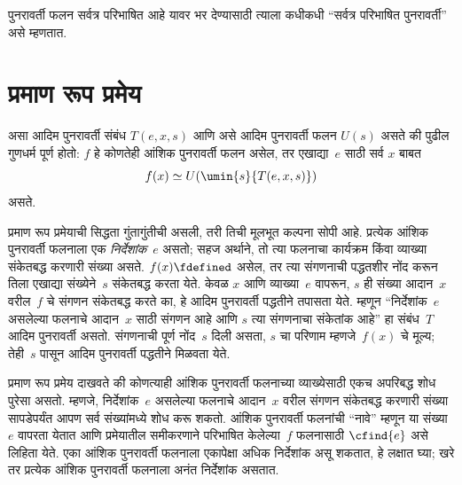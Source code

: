 पुनरावर्ती फलन सर्वत्र परिभाषित आहे यावर भर देण्यासाठी त्याला कधीकधी
``सर्वत्र परिभाषित पुनरावर्ती'' असे म्हणतात.











\section{प्रमाण रूप प्रमेय}\label{cmp:rec:nft:sec}

\begin{thm}[क्लिनीचे प्रमाण रूप प्रमेय]
\label{cmp:rec:nft:thm:kleene-nf}
असा आदिम पुनरावर्ती संबंध $T(e, x, s)$ आणि असे आदिम पुनरावर्ती फलन
$U(s)$ असते की पुढील गुणधर्म पूर्ण होतो: $f$ हे कोणतेही आंशिक पुनरावर्ती
फलन असेल, तर एखाद्या~$e$ साठी सर्व $x$ बाबत
\[f(x) \simeq U(\umin{s}{T(e, x, s)})
\]
असते.
\end{thm}

\begin{explain}
प्रमाण रूप प्रमेयाची सिद्धता गुंतागुंतीची असली, तरी तिची मूलभूत कल्पना
सोपी आहे. प्रत्येक आंशिक पुनरावर्ती फलनाला एक \emph{निर्देशांक}~$e$
असतो; सहज अर्थाने, तो त्या फलनाचा कार्यक्रम किंवा व्याख्या संकेतबद्ध
करणारी संख्या असते. $f(x) \fdefined$ असेल, तर त्या संगणनाची पद्धतशीर
नोंद करून तिला एखाद्या संख्येने~$s$ संकेतबद्ध करता येते. केवळ $x$ आणि
व्याख्या~$e$ वापरून, $s$ ही संख्या आदान~$x$ वरील~$f$ चे संगणन
संकेतबद्ध करते का, हे आदिम पुनरावर्ती पद्धतीने तपासता येते. म्हणून
``निर्देशांक~$e$ असलेल्या फलनाचे आदान~$x$ साठी संगणन आहे आणि $s$
त्या संगणनाचा संकेतांक आहे'' हा संबंध~$T$ आदिम पुनरावर्ती असतो.
संगणनाची पूर्ण नोंद~$s$ दिली असता, $s$ चा परिणाम म्हणजे~$f(x)$ चे मूल्य;
तेही~$s$ पासून आदिम पुनरावर्ती पद्धतीने मिळवता येते.

प्रमाण रूप प्रमेय दाखवते की कोणत्याही आंशिक पुनरावर्ती फलनाच्या
व्याख्येसाठी एकच अपरिबद्ध शोध पुरेसा असतो. म्हणजे, निर्देशांक~$e$
असलेल्या फलनाचे आदान~$x$ वरील संगणन संकेतबद्ध करणारी संख्या सापडेपर्यंत
आपण सर्व संख्यांमध्ये शोध करू शकतो. आंशिक पुनरावर्ती फलनांची ``नावे''
म्हणून या संख्या~$e$ वापरता येतात आणि प्रमेयातील समीकरणाने परिभाषित
केलेल्या~$f$ फलनासाठी $\cfind{e}$ असे लिहिता येते. एका आंशिक
पुनरावर्ती फलनाला एकापेक्षा अधिक निर्देशांक असू शकतात, हे लक्षात घ्या;
खरे तर प्रत्येक आंशिक पुनरावर्ती फलनाला अनंत निर्देशांक असतात.
\end{explain}











